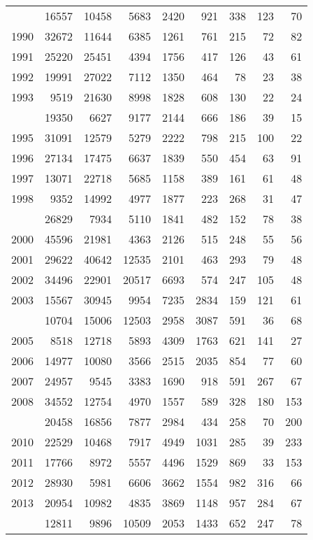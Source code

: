 \documentclass[
]{article}
\begin{document}
\begin{longtable}[t]{lrrrrrrrr}
\endfoot
\bottomrule
\endlastfoot
1989 & 16557 & 10458 & 5683 & 2420 & 921 & 338 & 123 & 70\\
1990 & 32672 & 11644 & 6385 & 1261 & 761 & 215 & 72 & 82\\
1991 & 25220 & 25451 & 4394 & 1756 & 417 & 126 & 43 & 61\\
1992 & 19991 & 27022 & 7112 & 1350 & 464 & 78 & 23 & 38\\
1993 & 9519 & 21630 & 8998 & 1828 & 608 & 130 & 22 & 24\\
\addlinespace
1994 & 19350 & 6627 & 9177 & 2144 & 666 & 186 & 39 & 15\\
1995 & 31091 & 12579 & 5279 & 2222 & 798 & 215 & 100 & 22\\
1996 & 27134 & 17475 & 6637 & 1839 & 550 & 454 & 63 & 91\\
1997 & 13071 & 22718 & 5685 & 1158 & 389 & 161 & 61 & 48\\
1998 & 9352 & 14992 & 4977 & 1877 & 223 & 268 & 31 & 47\\
\addlinespace
1999 & 26829 & 7934 & 5110 & 1841 & 482 & 152 & 78 & 38\\
2000 & 45596 & 21981 & 4363 & 2126 & 515 & 248 & 55 & 56\\
2001 & 29622 & 40642 & 12535 & 2101 & 463 & 293 & 79 & 48\\
2002 & 34496 & 22901 & 20517 & 6693 & 574 & 247 & 105 & 48\\
2003 & 15567 & 30945 & 9954 & 7235 & 2834 & 159 & 121 & 61\\
\addlinespace
2004 & 10704 & 15006 & 12503 & 2958 & 3087 & 591 & 36 & 68\\
2005 & 8518 & 12718 & 5893 & 4309 & 1763 & 621 & 141 & 27\\
2006 & 14977 & 10080 & 3566 & 2515 & 2035 & 854 & 77 & 60\\
2007 & 24957 & 9545 & 3383 & 1690 & 918 & 591 & 267 & 67\\
2008 & 34552 & 12754 & 4970 & 1557 & 589 & 328 & 180 & 153\\
\addlinespace
2009 & 20458 & 16856 & 7877 & 2984 & 434 & 258 & 70 & 200\\
2010 & 22529 & 10468 & 7917 & 4949 & 1031 & 285 & 39 & 233\\
2011 & 17766 & 8972 & 5557 & 4496 & 1529 & 869 & 33 & 153\\
2012 & 28930 & 5981 & 6606 & 3662 & 1554 & 982 & 316 & 66\\
2013 & 20954 & 10982 & 4835 & 3869 & 1148 & 957 & 284 & 67\\
\addlinespace
2014 & 12811 & 9896 & 10509 & 2053 & 1433 & 652 & 247 & 78\\

\end{longtable}
\end{document}
